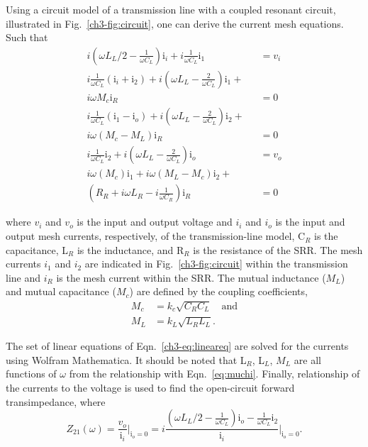 Using a circuit model of a transmission line with a coupled resonant circuit, illustrated in Fig.~\ref{ch3-fig:circuit}, one can derive the current mesh equations. Such that
\begin{subequations}
\begin{eqnarray}
i(\omega L_L/2 - \frac{1}{\omega C_L}) \text{i}_i +  i\frac{1}{\omega C_L} \text{i}_1 &= v_i  \\
i\frac{1}{\omega C_L} (\text{i}_{i}+\text{i}_2) + i(\omega L_L - \frac{2}{\omega C_L}) \text{i}_{1} + \nonumber \\
 i \omega M_c \text{i}_R &= 0  \\
i\frac{1}{\omega C_L} (\text{i}_{1}-\text{i}_{o}) + i(\omega L_L - \frac{2}{\omega C_L}) \text{i}_{2} + \nonumber \\
i \omega (M_c - M_L) \text{i}_R &= 0  \\
i \frac{1}{\omega C_L} \text{i}_{2} + i(\omega L_L - \frac{2}{\omega C_L}) \text{i}_{o}  &= v_o  \\
i \omega (M_c) \text{i}_{1} + i \omega (M_L - M_c)\text{i}_2 + \qquad \nonumber \\ 
(R_R + i \omega L_R - i\frac{1}{\omega C_R}) \text{i}_R  &= 0
\end{eqnarray}\label{ch3-eq:lineareq}
\end{subequations}

\noindent 
where $v_i$ and $v_o$ is the input and output voltage and $i_i$ and $i_o$ is the input and output mesh currents, respectively, of the transmission-line model, C$_R$ is the capacitance, L$_R$ is the inductance, and R$_R$ is the resistance of the SRR. The mesh currents $i_1$ and $i_2$ are indicated in Fig.~\ref{ch3-fig:circuit} within the transmission line and $i_R$ is the mesh current within the SRR. The mutual inductance ($M_L$) and mutual capacitance ($M_c$) are defined by the coupling coefficients, 
\begin{subequations}
\begin{eqnarray}
    M_c &= k_c \sqrt{C_R C_L}\quad \text{and} \\
    M_L &= k_L \sqrt{L_R L_L}.
\end{eqnarray}
\end{subequations}

The set of linear equations of Eqn.~\ref{ch3-eq:lineareq} are solved for the currents using Wolfram Mathematica. It should be noted that L$_R$, L$_L$, $M_L$ are all functions of $\omega$ from the relationship with Eqn.~\ref{eq:muchi}. Finally, relationship of the currents to the voltage is used to find the open-circuit forward transimpedance, where
\begin{equation}
    Z_{21}(\omega) = \frac{v_o}{\text{i}_i} \Biggr\rvert_{\text{i}_o=0} =i \frac{(\omega L_L/2 - \frac{1}{\omega C_L}) \text{i}_o - \frac{1}{\omega C_L} \text{i}_2  }{\text{i}_i} \Biggr\rvert_{\text{i}_o=0}.
\end{equation}


